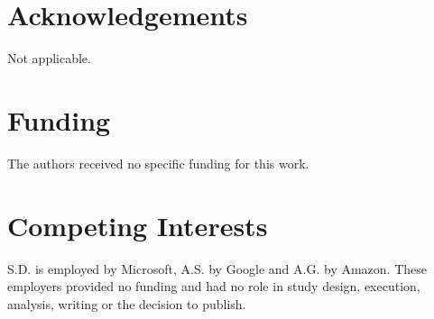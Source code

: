 \documentclass[12pt]{article}
\begin{document}
\section*{Acknowledgements}
Not applicable.

\section*{Funding}
The authors received no specific funding for this work.

\section*{Competing Interests}
S.D. is employed by Microsoft, A.S. by Google and A.G. by Amazon. These
employers provided no funding and had no role in study design, execution,
analysis, writing or the decision to publish.
\end{document}
